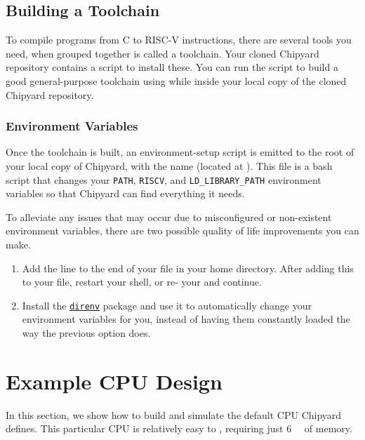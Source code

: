 \subsection{Building a Toolchain}\label{sec:Building_Toolchain}
To compile programs from C to RISC-V instructions, there are several tools you need, when grouped together is called a toolchain.
Your cloned Chipyard repository contains a script to install these.
You can run the script to build a good general-purpose toolchain using  while inside your local copy of the cloned Chipyard repository.

\subsubsection{Environment Variables}\label{sec:Environment_Variables}
Once the toolchain is built, an environment-setup script is emitted to the root of your local copy of Chipyard, with the name  (located at ).
This file is a bash script that changes your \texttt{PATH}, \texttt{RISCV}, and \texttt{LD\_LIBRARY\_PATH} environment variables so that Chipyard can find everything it needs.

To alleviate any issues that may occur due to misconfigured or non-existent environment variables, there are two possible quality of life improvements you can make.
\begin{enumerate}
\item Add the line  to the end of your  file in your home directory.
  After adding this to your  file, restart your shell, or re- your  and continue.
\item Install the \href{https://direnv.net/}{\texttt{direnv}} package and use it to automatically change your environment variables for you, instead of having them constantly loaded the way the previous option does.
\end{enumerate}

\section{Example CPU Design}\label{sec:Example_CPU_Design}
In this section, we show how to build and simulate the default CPU Chipyard defines.
This particular CPU is relatively easy to , requiring just \SI{6}{\giga\byte} of memory.

